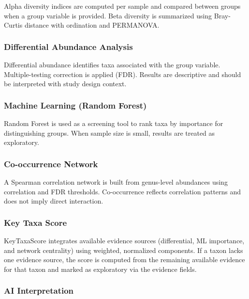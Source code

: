 \documentclass[
  letterpaper,
  DIV=11,
  numbers=noendperiod]{scrartcl}
\begin{document}
Alpha diversity indices are computed per sample and compared between
groups when a group variable is provided. Beta diversity is summarized
using Bray-Curtis distance with ordination and PERMANOVA.

\subsubsection{Differential Abundance
Analysis}\label{differential-abundance-analysis}

Differential abundance identifies taxa associated with the group
variable. Multiple-testing correction is applied (FDR). Results are
descriptive and should be interpreted with study design context.

\subsubsection{Machine Learning (Random
Forest)}\label{machine-learning-random-forest}

Random Forest is used as a screening tool to rank taxa by importance for
distinguishing groups. When sample size is small, results are treated as
exploratory.

\subsubsection{Co-occurrence Network}\label{co-occurrence-network}

A Spearman correlation network is built from genus-level abundances
using correlation and FDR thresholds. Co-occurrence reflects correlation
patterns and does not imply direct interaction.

\subsubsection{Key Taxa Score}\label{key-taxa-score}

KeyTaxaScore integrates available evidence sources (differential, ML
importance, and network centrality) using weighted, normalized
components. If a taxon lacks one evidence source, the score is computed
from the remaining available evidence for that taxon and marked as
exploratory via the evidence fields.

\subsubsection{AI Interpretation}\label{ai-interpretation}
\end{document}
